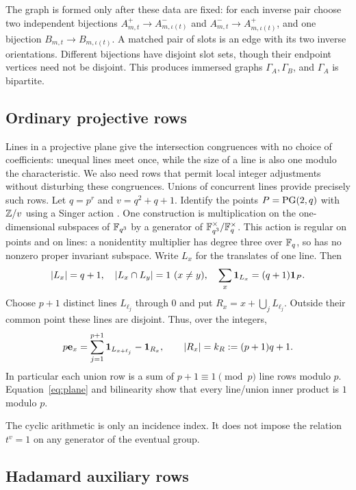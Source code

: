 The graph is formed only after these data are fixed: for each inverse pair choose two independent bijections $A^+_{m,t}\to A^-_{m,\iota(t)}$ and $A^-_{m,t}\to A^+_{m,\iota(t)}$, and one bijection $B_{m,t}\to B_{m,\iota(t)}$. A matched pair of slots is an edge with its two inverse orientations. Different bijections have disjoint slot sets, though their endpoint vertices need not be disjoint. This produces immersed graphs $\Gamma_A,\Gamma_B$, and $\Gamma_A$ is bipartite.

\subsection{Ordinary projective rows}

Lines in a projective plane give the intersection congruences with no choice of coefficients: unequal lines meet once, while the size of a line is also one modulo the characteristic. We also need rows that permit local integer adjustments without disturbing these congruences. Unions of concurrent lines provide precisely such rows.
Let $q=p^r$ and $v=q^2+q+1$. Identify the points $P=\operatorname{PG}(2,q)$ with $\mathbb Z/v$ using a Singer action \cite{Sin38}. One construction is multiplication on the one-dimensional subspaces of $\mathbb F_{q^3}$ by a generator of $\mathbb F_{q^3}^{\times}/\mathbb F_q^{\times}$. This action is regular on points and on lines: a nonidentity multiplier has degree three over $\mathbb F_q$, so has no nonzero proper invariant subspace. Write $L_x$ for the translates of one line. Then
\begin{equation}\label{eq:plane}
 |L_x|=q+1,\quad |L_x\cap L_y|=1\ (x\ne y),\quad
 \sum_x\mathbf1_{L_x}=(q+1)\mathbf1_P.
\end{equation}
Choose $p+1$ distinct lines $L_{\ell_j}$ through $0$ and put $R_x=x+\bigcup_jL_{\ell_j}$. Outside their common point these lines are disjoint. Thus, over the integers,
\begin{equation}\label{eq:pencil}
 p\mathbf e_x=\sum_{j=1}^{p+1}\mathbf1_{L_{x+\ell_j}}-\mathbf1_{R_x},
 \qquad |R_x|=k_R:=(p+1)q+1.
\end{equation}
In particular each union row is a sum of $p+1\equiv1\pmod p$ line rows modulo $p$. Equation~\eqref{eq:plane} and bilinearity show that every line/union inner product is $1$ modulo $p$.

The cyclic arithmetic is only an incidence index. It does not impose the relation $t^v=1$ on any generator of the eventual group.

\subsection{Hadamard auxiliary rows}

